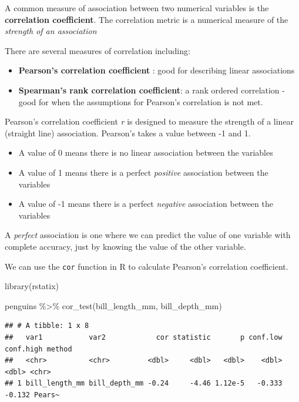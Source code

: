 \documentclass[
]{book}
\newenvironment{Shaded}{\begin{snugshade}}{\end{snugshade}}
\newcommand{\FunctionTok}[1]{\textcolor[rgb]{0.00,0.00,0.00}{#1}}
\newcommand{\NormalTok}[1]{#1}
\newcommand{\SpecialCharTok}[1]{\textcolor[rgb]{0.00,0.00,0.00}{#1}}
\begin{document}
A common measure of association between two numerical variables is the \textbf{correlation coefficient}. The correlation metric is a numerical measure of the \emph{strength of an association}

There are several measures of correlation including:

\begin{itemize}
\item
  \textbf{Pearson's correlation coefficient} : good for describing linear associations
\item
  \textbf{Spearman's rank correlation coefficient}: a rank ordered correlation - good for when the assumptions for Pearson's correlation is not met.
\end{itemize}

Pearson's correlation coefficient \emph{r} is designed to measure the strength of a linear (straight line) association. Pearson's takes a value between -1 and 1.

\begin{itemize}
\item
  A value of 0 means there is no linear association between the variables
\item
  A value of 1 means there is a perfect \emph{positive} association between the variables
\item
  A value of -1 means there is a perfect \emph{negative} association between the variables
\end{itemize}

A \emph{perfect} association is one where we can predict the value of one variable with complete accuracy, just by knowing the value of the other variable.

We can use the \texttt{cor} function in R to calculate Pearson's correlation coefficient.

\begin{Shaded}
\begin{Highlighting}[]
\FunctionTok{library}\NormalTok{(rstatix)}

\NormalTok{penguins }\SpecialCharTok{\%\textgreater{}\%} 
  \FunctionTok{cor\_test}\NormalTok{(bill\_length\_mm, bill\_depth\_mm)}
\end{Highlighting}
\end{Shaded}

\begin{verbatim}
## # A tibble: 1 x 8
##   var1           var2            cor statistic       p conf.low conf.high method
##   <chr>          <chr>         <dbl>     <dbl>   <dbl>    <dbl>     <dbl> <chr> 
## 1 bill_length_mm bill_depth_mm -0.24     -4.46 1.12e-5   -0.333    -0.132 Pears~
\end{verbatim}
\end{document}
